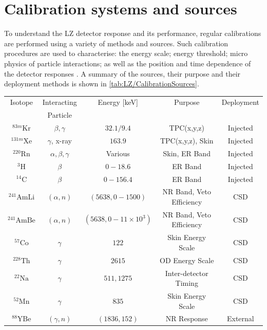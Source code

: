 \section{Calibration systems and sources}\label{sec:LZ/CalibrationSources}
To understand the LZ detector response and its performance, regular calibrations are performed using a variety of methods and sources. Such calibration procedures are used to characterise: the energy scale; energy threshold; micro physics of particle interactions; as well as the position and time dependence of the detector responses \cite{LZ:2024bsz}. A summary of the sources, their purpose and their deployment methods is shown in \autoref{tab:LZ/CalibrationSources}.
\begin{table}[h!]
    \centering
    \begin{tabular}{|c|c|c|c|c|}
         \hline
         Isotope & Interacting & Energy [keV] & Purpose & Deployment \\
         & Particle & & & \\
         \hline
         $^{83m}\text{Kr}$ & $\beta, \gamma$ & $32.1/9.4$ &TPC(x,y,z) & Injected\\
         $^{131m}\text{Xe}$& $\gamma$, x-ray & $163.9$ & TPC(x,y,z), Skin & Injected\\
         $^{220}\text{Rn}$& $\alpha,\beta,\gamma$ & Various \cite{Jorg:2023nvl} & Skin, ER Band & Injected\\
         $^{3}\text{H}$& $\beta$ & $0-18.6$ &ER Band & Injected\\
         $^{14}\text{C}$& $\beta$ & $0-156.4$ &ER Band & Injected\\
         $^{241}\text{AmLi}$& $(\alpha,n)$ & $(5638, 0-1500)$ & NR Band, Veto Efficiency & CSD\\
         $^{241}\text{AmBe}$& $(\alpha,n)$ & $(5638, 0-11\times10^{3})$ & NR Band, Veto Efficiency & CSD\\
         $^{57}\text{Co}$& $\gamma$ & $122$ &Skin Energy Scale & CSD\\
         $^{228}\text{Th}$& $\gamma$ & $2615$ &OD Energy Scale & CSD\\
         $^{22}\text{Na}$& $\gamma$ & $511, 1275$ &Inter-detector Timing & CSD\\
         $^{52}\text{Mn}$& $\gamma$ & $835$ &Skin Energy Scale & CSD\\
         $^{88}\text{YBe}$& $(\gamma,n)$ & $(1836,152)$ &NR Response & External\\

\end{tabular}
\end{table}
